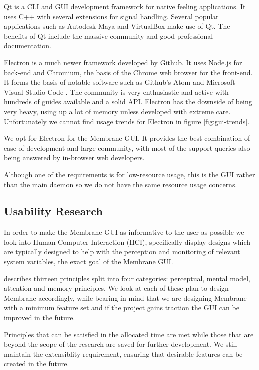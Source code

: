 \documentclass[11pt, a4paper, twoside]{report}
\begin{document}
Qt is a CLI and GUI development framework for native feeling applications. It uses C++ with several extensions for signal handling. Several popular applications such as Autodesk Maya and VirtualBox \citep*{oracle2017logging, autodesk2017qt} make use of Qt. The benefits of Qt include the massive community and good professional documentation. \citep{slant2017qtelectron}

Electron is a much newer framework developed by Github. It uses Node.js for back-end and Chromium, the basis of the Chrome web browser for the front-end. It forms the basis of notable software such as Github's Atom and Microsoft Visual Studio Code \citep{james2015vselectron}. The community is very enthusiastic and active with hundreds of guides available and a solid API. Electron has the downside of being very heavy, using up a lot of memory unless developed with extreme care. Unfortunately we cannot find usage trends for Electron in figure \ref{fig:gui-trends}.

We opt for Electron for the Membrane GUI. It provides the best combination of ease of development and large community, with most of the support queries also being answered by in-browser web developers.

Although one of the requirements is for low-resource usage, this is the GUI rather than the main daemon so we do not have the same resource usage concerns.

\subsection{Usability Research}

In order to make the Membrane GUI as informative to the user as possible we look into Human Computer Interaction (HCI), specifically display designs which are typically designed to help with the perception and monitoring of relevant system variables, the exact goal of the Membrane GUI.

\cite{wickens1998introduction} describes thirteen principles split into four categories: perceptual, mental model, attention and memory principles. We look at each of these plan to design Membrane accordingly, while bearing in mind that we are designing Membrane with a minimum feature set \citep{blank2010mfs} and if the project gains traction the GUI can be improved in the future.

Principles that can be satisfied in the allocated time are met while those that are beyond the scope of the research are saved for further development. We still maintain the extensiblity requirement, ensuring that desirable features can be created in the future.
\end{document}
